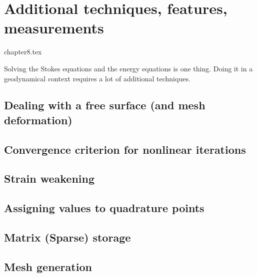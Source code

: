 \chapter{Additional techniques, features, measurements} %

\begin{flushright} {\tiny {\color{gray} chapter8.tex}} \end{flushright}

Solving the Stokes equations and the energy equations is one thing. Doing it in 
a geodynamical context requires a lot of additional techniques. 
\newpage %
\section{Dealing with a free surface (and mesh deformation)}\label{sec:freesurface}  
\newpage %
\section{Convergence criterion for nonlinear iterations\label{sec:nlconvcrit}} 
\newpage %
\section{Strain weakening} \label{sec:strainweakening}  %
\newpage %
\section{Assigning values to quadrature points \label{ss:averagings}}  %
\newpage %
\section{Matrix (Sparse) storage}  %
\newpage %
\section{Mesh generation} \label{sec:meshes}  %
\newpage %
